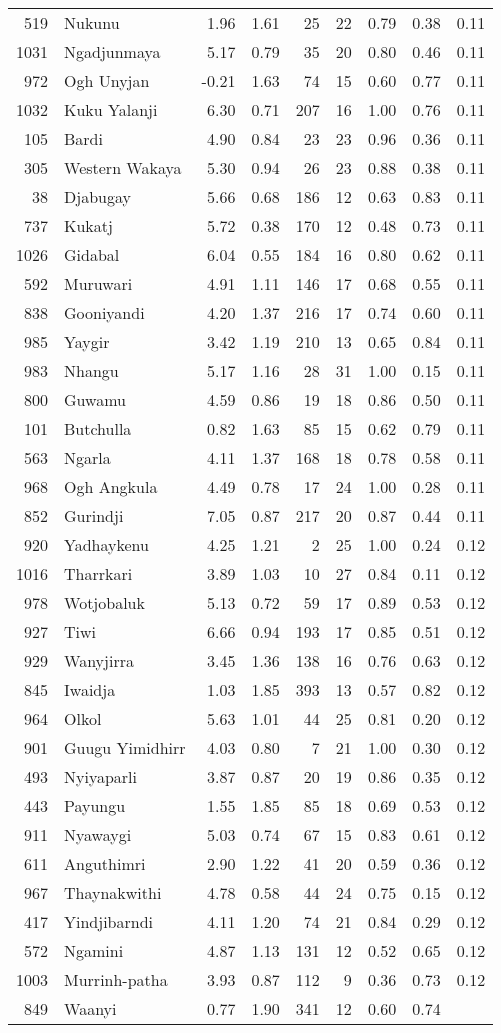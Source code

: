 \begin{longtable}[]{@{}rlrrrrrrr@{}}
519 & Nukunu & 1.96 & 1.61 & 25 & 22 & 0.79 & 0.38 & 0.11\tabularnewline
1031 & Ngadjunmaya & 5.17 & 0.79 & 35 & 20 & 0.80 & 0.46 &
0.11\tabularnewline
972 & Ogh Unyjan & -0.21 & 1.63 & 74 & 15 & 0.60 & 0.77 &
0.11\tabularnewline
1032 & Kuku Yalanji & 6.30 & 0.71 & 207 & 16 & 1.00 & 0.76 &
0.11\tabularnewline
105 & Bardi & 4.90 & 0.84 & 23 & 23 & 0.96 & 0.36 & 0.11\tabularnewline
305 & Western Wakaya & 5.30 & 0.94 & 26 & 23 & 0.88 & 0.38 &
0.11\tabularnewline
38 & Djabugay & 5.66 & 0.68 & 186 & 12 & 0.63 & 0.83 &
0.11\tabularnewline
737 & Kukatj & 5.72 & 0.38 & 170 & 12 & 0.48 & 0.73 &
0.11\tabularnewline
1026 & Gidabal & 6.04 & 0.55 & 184 & 16 & 0.80 & 0.62 &
0.11\tabularnewline
592 & Muruwari & 4.91 & 1.11 & 146 & 17 & 0.68 & 0.55 &
0.11\tabularnewline
838 & Gooniyandi & 4.20 & 1.37 & 216 & 17 & 0.74 & 0.60 &
0.11\tabularnewline
985 & Yaygir & 3.42 & 1.19 & 210 & 13 & 0.65 & 0.84 &
0.11\tabularnewline
983 & Nhangu & 5.17 & 1.16 & 28 & 31 & 1.00 & 0.15 & 0.11\tabularnewline
800 & Guwamu & 4.59 & 0.86 & 19 & 18 & 0.86 & 0.50 & 0.11\tabularnewline
101 & Butchulla & 0.82 & 1.63 & 85 & 15 & 0.62 & 0.79 &
0.11\tabularnewline
563 & Ngarla & 4.11 & 1.37 & 168 & 18 & 0.78 & 0.58 &
0.11\tabularnewline
968 & Ogh Angkula & 4.49 & 0.78 & 17 & 24 & 1.00 & 0.28 &
0.11\tabularnewline
852 & Gurindji & 7.05 & 0.87 & 217 & 20 & 0.87 & 0.44 &
0.11\tabularnewline
920 & Yadhaykenu & 4.25 & 1.21 & 2 & 25 & 1.00 & 0.24 &
0.12\tabularnewline
1016 & Tharrkari & 3.89 & 1.03 & 10 & 27 & 0.84 & 0.11 &
0.12\tabularnewline
978 & Wotjobaluk & 5.13 & 0.72 & 59 & 17 & 0.89 & 0.53 &
0.12\tabularnewline
927 & Tiwi & 6.66 & 0.94 & 193 & 17 & 0.85 & 0.51 & 0.12\tabularnewline
929 & Wanyjirra & 3.45 & 1.36 & 138 & 16 & 0.76 & 0.63 &
0.12\tabularnewline
845 & Iwaidja & 1.03 & 1.85 & 393 & 13 & 0.57 & 0.82 &
0.12\tabularnewline
964 & Olkol & 5.63 & 1.01 & 44 & 25 & 0.81 & 0.20 & 0.12\tabularnewline
901 & Guugu Yimidhirr & 4.03 & 0.80 & 7 & 21 & 1.00 & 0.30 &
0.12\tabularnewline
493 & Nyiyaparli & 3.87 & 0.87 & 20 & 19 & 0.86 & 0.35 &
0.12\tabularnewline
443 & Payungu & 1.55 & 1.85 & 85 & 18 & 0.69 & 0.53 &
0.12\tabularnewline
911 & Nyawaygi & 5.03 & 0.74 & 67 & 15 & 0.83 & 0.61 &
0.12\tabularnewline
611 & Anguthimri & 2.90 & 1.22 & 41 & 20 & 0.59 & 0.36 &
0.12\tabularnewline
967 & Thaynakwithi & 4.78 & 0.58 & 44 & 24 & 0.75 & 0.15 &
0.12\tabularnewline
417 & Yindjibarndi & 4.11 & 1.20 & 74 & 21 & 0.84 & 0.29 &
0.12\tabularnewline
572 & Ngamini & 4.87 & 1.13 & 131 & 12 & 0.52 & 0.65 &
0.12\tabularnewline
1003 & Murrinh-patha & 3.93 & 0.87 & 112 & 9 & 0.36 & 0.73 &
0.12\tabularnewline
849 & Waanyi & 0.77 & 1.90 & 341 & 12 & 0.60 & 0.74 &

\end{longtable}
